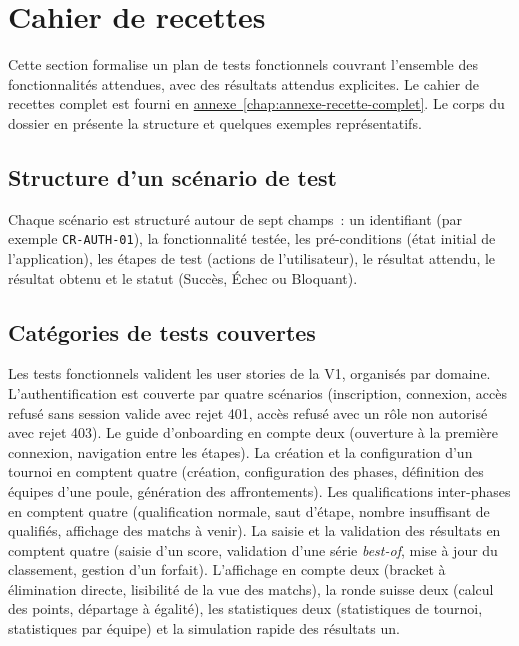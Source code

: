 
\section{Cahier de recettes}\label{sec:cahier-recettes}

Cette section formalise un plan de tests fonctionnels couvrant l'ensemble des fonctionnalités attendues, avec des résultats attendus explicites. Le cahier de recettes complet est fourni en \hyperref[chap:annexe-recette-complet]{annexe~\ref*{chap:annexe-recette-complet}}. Le corps du dossier en présente la structure et quelques exemples représentatifs.

\subsection{Structure d'un scénario de test}
Chaque scénario est structuré autour de sept champs~: un identifiant (par exemple \texttt{CR-AUTH-01}), la fonctionnalité testée, les pré-conditions (état initial de l'application), les étapes de test (actions de l'utilisateur), le résultat attendu, le résultat obtenu et le statut (Succès, Échec ou Bloquant).

\subsection{Catégories de tests couvertes}

Les tests fonctionnels valident les user stories de la V1, organisés par domaine. L'authentification est couverte par quatre scénarios (inscription, connexion, accès refusé sans session valide avec rejet 401, accès refusé avec un rôle non autorisé avec rejet 403). Le guide d'onboarding en compte deux (ouverture à la première connexion, navigation entre les étapes). La création et la configuration d'un tournoi en comptent quatre (création, configuration des phases, définition des équipes d'une poule, génération des affrontements). Les qualifications inter-phases en comptent quatre (qualification normale, saut d'étape, nombre insuffisant de qualifiés, affichage des matchs à venir). La saisie et la validation des résultats en comptent quatre (saisie d'un score, validation d'une série \emph{best-of}, mise à jour du classement, gestion d'un forfait). L'affichage en compte deux (bracket à élimination directe, lisibilité de la vue des matchs), la ronde suisse deux (calcul des points, départage à égalité), les statistiques deux (statistiques de tournoi, statistiques par équipe) et la simulation rapide des résultats un.

